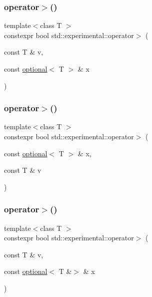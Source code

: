 \mbox{\label{namespacestd_1_1experimental_a2c15354bc231381036462b92afd3737e}} 
\subsubsection{\texorpdfstring{operator$>$()}{operator>()}\hspace{0.1cm}{\footnotesize\ttfamily [4/9]}}
{\footnotesize\ttfamily template$<$class T $>$ \\
constexpr bool std\+::experimental\+::operator$>$ (\begin{DoxyParamCaption}\item[{const T \&}]{v,  }\item[{const \hyperlink{classstd_1_1experimental_1_1optional}{optional}$<$ T $>$ \&}]{x }\end{DoxyParamCaption})}

\mbox{\label{namespacestd_1_1experimental_acd392a8263ad2dd322655078d53e77ad}} 
\subsubsection{\texorpdfstring{operator$>$()}{operator>()}\hspace{0.1cm}{\footnotesize\ttfamily [5/9]}}
{\footnotesize\ttfamily template$<$class T $>$ \\
constexpr bool std\+::experimental\+::operator$>$ (\begin{DoxyParamCaption}\item[{const \hyperlink{classstd_1_1experimental_1_1optional}{optional}$<$ T $>$ \&}]{x,  }\item[{const T \&}]{v }\end{DoxyParamCaption})}

\mbox{\label{namespacestd_1_1experimental_a84d294fc6ef231696e23f6b21f0391aa}} 
\subsubsection{\texorpdfstring{operator$>$()}{operator>()}\hspace{0.1cm}{\footnotesize\ttfamily [6/9]}}
{\footnotesize\ttfamily template$<$class T $>$ \\
constexpr bool std\+::experimental\+::operator$>$ (\begin{DoxyParamCaption}\item[{const T \&}]{v,  }\item[{const \hyperlink{classstd_1_1experimental_1_1optional}{optional}$<$ T \&$>$ \&}]{x }\end{DoxyParamCaption})}

